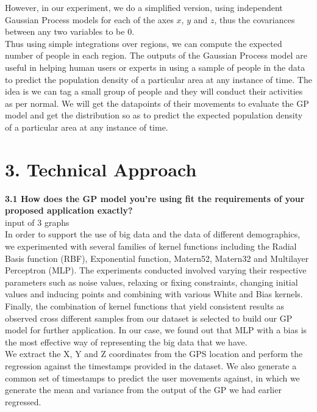 \documentclass[letterpaper]{article}
\begin{document}
However, in our experiment, we do a simplified version, using independent Gaussian Process models for each of the axes $x$, $y$ and $z$, thus the covariances between any two variables to be $0$. \\

Thus using simple integrations over regions, we can compute the expected number of people in each region. The outputs of the Gaussian Process model are useful in helping human users or experts in using a sample of people in the data to predict the population density of a particular area at any instance of time. The idea is we can tag a small group of people and they will conduct their activities as per normal. We will get the datapoints of their movements to evaluate the GP model and get the distribution so as to predict the expected population density of a particular area at any instance of time. \\

\section{3.  Technical Approach}

{\bf3.1  How does the GP model you’re using fit the requirements of your proposed application exactly?} \\

input of 3 graphs \\


In order to support the use of big data and the data of different demographics, we experimented with several families of kernel functions including the Radial Basis function (RBF), Exponential function, Matern52, Matern32 and Multilayer Perceptron (MLP). The experiments conducted involved varying their respective parameters such as noise values, relaxing or fixing constraints, changing initial values and inducing points and combining with various White and Bias kernels. Finally, the combination of kernel functions that yield consistent results as observed cross different samples from our dataset is selected to build our GP model for further application. In our case, we found out that MLP with a bias is the most effective way of representing the big data that we have.\\

We extract the X, Y and Z coordinates from the GPS location and perform the regression against the timestamps provided in the dataset. We also generate a common set of timestamps to predict the user movements against, in which we generate the mean and variance from the output of the GP we had earlier regressed. \\
\end{document}
